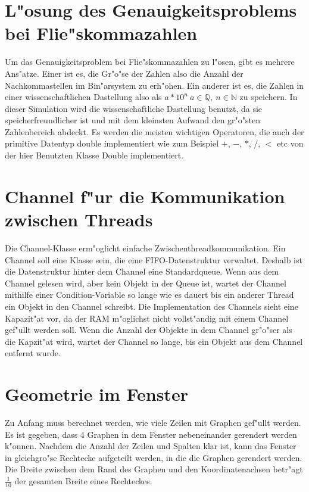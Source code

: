 \documentclass[14pt, a4paper]{report}
\begin{document}
\section{L"osung des Genauigkeitsproblems bei Flie"skommazahlen}
Um das Genauigkeitsproblem bei Flie"skommazahlen zu l"osen, gibt es mehrere Ans"atze.
Einer ist es, die Gr"o"se der Zahlen also die Anzahl der Nachkommastellen im
Bin"arsystem zu erh"ohen. Ein anderer ist es, die Zahlen in einer wissenschaftlichen
Dastellung also als $a * 10^n ~ a \in \mathbb Q, ~ n \in \mathbb N$ zu speichern. In
dieser Simulation wird die wissenschaftliche Dastellung benutzt, da sie 
speicherfreundlicher ist und mit dem kleinsten Aufwand den gr"o"sten Zahlenbereich
abdeckt. Es werden die meisten wichtigen Operatoren, die auch der primitive Datentyp double 
implementiert wie zum Beispiel $+$, $-$, $*$, $/$, $<$ etc von der hier Benutzten Klasse Double
implementiert.

\section{Channel f"ur die Kommunikation zwischen Threads}
Die Channel-Klasse erm"oglicht einfache Zwischenthreadkommunikation. Ein Channel soll
eine Klasse sein, die eine FIFO-Datenstruktur verwaltet. Deshalb ist die Datenstruktur
hinter dem Channel eine Standardqueue. Wenn aus dem Channel gelesen wird, aber kein 
Objekt in der Queue ist, wartet der Channel mithilfe einer Condition-Variable so lange 
wie es dauert bis ein anderer
Thread ein Objekt in den Channel schreibt. Die Implementation des Channels sieht
eine Kapazit"at vor, da der RAM m"oglichst nicht vollst"andig mit einem Channel
gef"ullt werden soll.
Wenn die Anzahl der Objekte in dem Channel gr"o"ser als die Kapzit"at wird, wartet der 
Channel so lange, bis ein Objekt aus dem Channel entfernt wurde.

\section{Geometrie im Fenster}
Zu Anfang muss berechnet werden, wie viele Zeilen mit Graphen gef"ullt werden. Es ist
gegeben, dass 4 Graphen in dem Fenster nebeneinander gerendert werden k"onnen. 
Nachdem die 
Anzahl der Zeilen und Spalten klar ist, kann das Fenster in gleichgro"se Rechtecke
aufgeteilt werden, in die die Graphen gerendert werden. Die Breite zwischen dem Rand des 
Graphen und den Koordinatenachsen betr"agt $\frac{1}{10}$ der gesamten Breite eines
Rechteckes.
\end{document}
